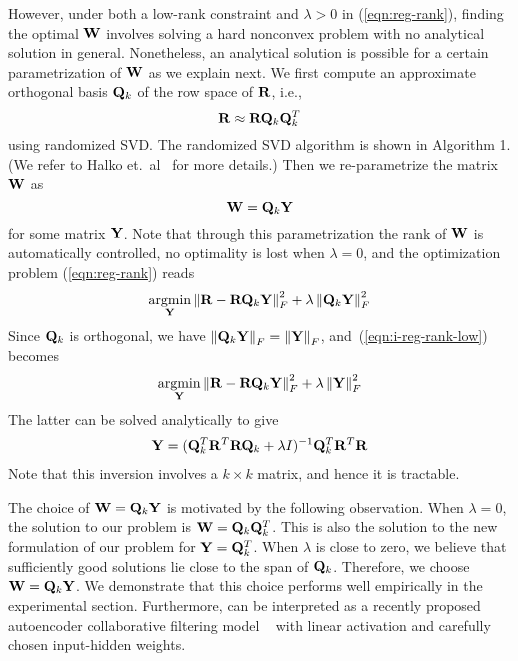 %



However, under both a low-rank constraint and $\lambda > 0$ in (\ref{eqn:reg-rank}), finding the optimal $\mathbf{W}$ involves solving a hard nonconvex problem with no analytical solution in general. Nonetheless, an analytical solution is possible for a certain parametrization of $\mathbf{W}$ as we explain next. We first compute an approximate orthogonal basis $\mathbf{Q}_k$ of the row space of $\mathbf{R}$, i.e.,
\begin{equation}
\mathbf{R} \approx \mathbf{R} \mathbf{Q}_k \mathbf{Q}_k^T
\end{equation}
using randomized SVD. The randomized SVD algorithm is shown in Algorithm 1. (We refer to Halko et.~al~\citep{halko2011} for more details.)
Then we re-parametrize the matrix $\mathbf{W}$ as 
\begin{equation}
\mathbf{W} = \mathbf{Q}_k \mathbf{Y}
\end{equation}
for some matrix $\mathbf{Y}$. Note that through this parametrization the rank of $\mathbf{W}$ is automatically controlled, no optimality is lost when $\lambda=0$, and the optimization problem (\ref{eqn:reg-rank}) reads
\begin{align}
\label{eqn:i-reg-rank-low}
\underset{\mathbf{Y}} {\mathrm{argmin}}  \left \| \mathbf{R} - \mathbf{R} \mathbf{Q}_k \mathbf{Y} \right \|_F^2 + \lambda \left \|  \mathbf{Q}_k \mathbf{Y} \right \|_F^2 
\end{align}
Since $\mathbf{Q}_k$ is orthogonal, we have $\left \| \mathbf{Q}_k \mathbf{Y} \right \|_F = \left \|\mathbf{Y}\right \|_F$, and~(\ref{eqn:i-reg-rank-low}) becomes 
\begin{align}
\underset{\mathbf{Y}}{\mathrm{argmin}} \left \| \mathbf{R} - \mathbf{R}\mathbf{Q}_k\mathbf{Y}\right \|_F^2 + \lambda \left \|  \mathbf{Y} \right \|_F^2 
\end{align}
The latter can be solved analytically to give 
\begin{align*}
\mathbf{Y} = (\mathbf{Q}_k^T \mathbf{R}^T\mathbf{R}\mathbf{Q}_k +\lambda I)^{-1} \mathbf{Q}_k^T \mathbf{R}^T \mathbf{R}
\end{align*}
Note that this inversion involves a $k \times k$ matrix, and hence it is tractable.


The choice of $\mathbf{W} = \mathbf{Q}_k \mathbf{Y}$ is motivated by the following observation. When $\lambda = 0$, the solution to our problem is $\mathbf{W} = \mathbf{Q}_k \mathbf{Q}_k^T$. This is also the solution to the new formulation of our problem for $\mathbf{Y} = \mathbf{Q}_k^T$. When $\lambda$ is close to zero, we believe that sufficiently good solutions lie close to the span of $\mathbf{Q}_k$. Therefore, we choose $\mathbf{W} = \mathbf{Q}_k \mathbf{Y}$. We demonstrate that this choice performs well empirically in the experimental section. Furthermore, \LinearLow can be interpreted as a recently proposed autoencoder collaborative filtering model ~\cite{Sedhain:2015} with linear activation and carefully chosen input-hidden weights.
 
